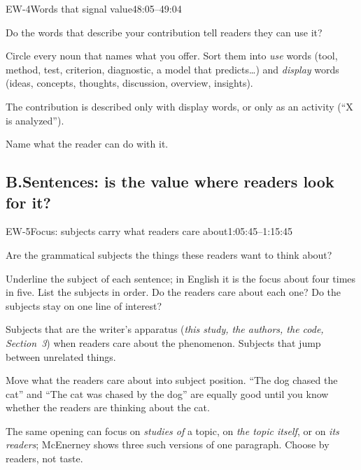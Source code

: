 \documentclass[11pt]{article}
\begin{document}
\begin{criterion}{EW-4}{Words that signal value}{48:05--49:04}
\begin{fields}
  \item[Ask] Do the words that describe your contribution tell readers they can use it?
  \item[Check] Circle every noun that names what you offer. Sort them into \emph{use} words (tool, method,
    test, criterion, diagnostic, a model that predicts\ldots) and \emph{display} words (ideas, concepts,
    thoughts, discussion, overview, insights).
  \item[Red flags] The contribution is described only with display words, or only as an activity (``X is
    analyzed'').
  \item[Fix] Name what the reader can do with it.
\end{fields}
\end{criterion}

\subsection{\texorpdfstring{B.\enspace}{B. }Sentences: is the value where readers look for it?}

\begin{criterion}{EW-5}{Focus: subjects carry what readers care about}{1:05:45--1:15:45}
\begin{fields}
  \item[Ask] Are the grammatical subjects the things these readers want to think about?
  \item[Check] Underline the subject of each sentence; in English it is the focus about four times in five.
    List the subjects in order. Do the readers care about each one? Do the subjects stay on one line of interest?
  \item[Red flags] Subjects that are the writer's apparatus (\emph{this study, the authors, the code,
    Section~3}) when readers care about the phenomenon. Subjects that jump between unrelated things.
  \item[Fix] Move what the readers care about into subject position. ``The dog chased the cat'' and ``The cat
    was chased by the dog'' are equally good until you know whether the readers are thinking about the cat.
  \item[Note] The same opening can focus on \emph{studies of} a topic, on \emph{the topic itself}, or on
    \emph{its readers}; McEnerney shows three such versions of one paragraph. Choose by readers, not taste.
\end{fields}
\end{criterion}
\end{document}
